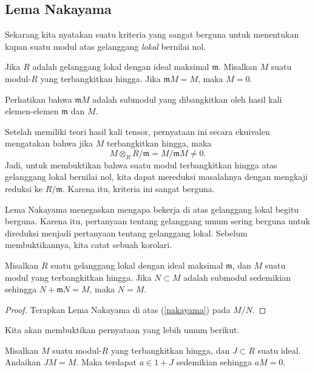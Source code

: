 \subsection{Lema Nakayama}

Sekarang kita nyatakan suatu kriteria yang sangat berguna untuk menentukan kapan suatu modul atas
gelanggang \emph{lokal} bernilai nol.


\begin{lemma} \label{nakayama} Jika $R$ adalah gelanggang lokal dengan
ideal maksimal
$\mathfrak{m}$. Misalkan $M$ suatu modul-$R$ yang terbangkitkan hingga. Jika
$\mathfrak{m}M = M$, maka $M = 0$.
\end{lemma}

Perhatikan bahwa $\mathfrak{m}M$ adalah submodul yang dibangkitkan oleh hasil kali
elemen-elemen $\mathfrak{m}$ dan $M$.

\begin{remark}
Setelah memiliki teori hasil kali tensor, pernyataan ini secara ekuivalen mengatakan bahwa
jika $M$ terbangkitkan hingga, maka
\[ M \otimes_R R/\mathfrak{m} = M/\mathfrak{m}M \neq 0.  \]
Jadi, untuk membuktikan bahwa suatu modul terbangkitkan hingga atas gelanggang lokal bernilai nol, kita
dapat mereduksi masalahnya dengan mengkaji reduksi ke $R/\mathfrak{m}$. Karena itu, kriteria ini sangat
berguna.
\end{remark}

Lema Nakayama menegaskan mengapa bekerja di atas gelanggang lokal begitu berguna.
Karena itu, pertanyaan tentang gelanggang umum sering berguna untuk direduksi menjadi pertanyaan tentang
gelanggang lokal.
Sebelum membuktikannya, kita catat sebuah korolari.

\begin{corollary}
Misalkan $R$ suatu gelanggang lokal dengan ideal maksimal $\mathfrak{m}$, dan $M$ suatu modul yang
terbangkitkan hingga. Jika $N \subset M$ adalah submodul sedemikian sehingga $N +
\mathfrak{m}N =
M$, maka $N=M$.
\end{corollary}
\begin{proof}
Terapkan Lema Nakayama di atas (\cref{nakayama}) pada $M/N$.
\end{proof}


Kita akan membuktikan pernyataan yang lebih umum berikut.

\begin{proposition} 
Misalkan $M$ suatu modul-$R$ yang terbangkitkan hingga, dan $J \subset R$ suatu ideal.
Andaikan $JM = M$. Maka terdapat $a \in 1+J$ sedemikian sehingga $aM = 0$.
\end{proposition} 


